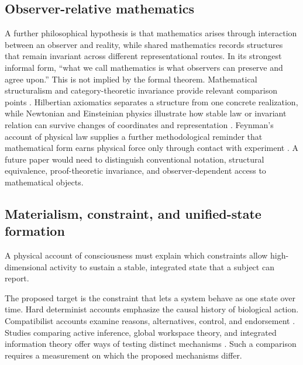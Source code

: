 \subsection{Observer-relative mathematics}

A further philosophical hypothesis is that mathematics arises through interaction between an observer and reality, while shared mathematics records structures that remain invariant across different representational routes. In its strongest informal form, ``what we call mathematics is what observers can preserve and agree upon.'' This is not implied by the formal theorem. Mathematical structuralism and category-theoretic invariance provide relevant comparison points \parencite{Shapiro1997,Leinster2014}. Hilbertian axiomatics separates a structure from one concrete realization, while Newtonian and Einsteinian physics illustrate how stable law or invariant relation can survive changes of coordinates and representation \parencite{Hilbert1902,Newton1999,Einstein1905}. Feynman's account of physical law supplies a further methodological reminder that mathematical form earns physical force only through contact with experiment \parencite{Feynman1965}. A future paper would need to distinguish conventional notation, structural equivalence, proof-theoretic invariance, and observer-dependent access to mathematical objects.

\subsection{Materialism, constraint, and unified-state formation}

\begin{hypothesis}
A physical account of consciousness must explain which constraints allow high-dimensional activity to sustain a stable, integrated state that a subject can report.
\end{hypothesis}
The proposed target is the constraint that lets a system behave as one state over time. Hard determinist accounts emphasize the causal history of biological action. Compatibilist accounts examine reasons, alternatives, control, and endorsement \parencite{Sapolsky2023,List2019,Dennett2003,Frankfurt1971}. Studies comparing active inference, global workspace theory, and integrated information theory offer ways of testing distinct mechanisms \parencite{SethBayne2022,Cogitate2025,Laukkonen2025,Whyte2026,Robinson2025}. Such a comparison requires a measurement on which the proposed mechanisms differ.

